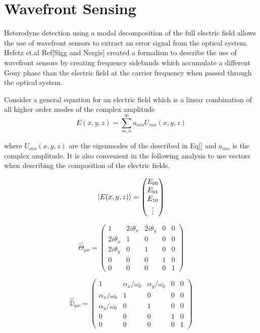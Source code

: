 \documentclass[oneside]{book}
\begin{document}
		
		\section{Wavefront Sensing}
		Heterodyne detection using a modal decomposition of the full electric field allows the use of wavefront sensors to extract an error signal from the optical system.  Hefetz et.al Ref[Sigg and Nergis] created a formalism to describe the use of wavefront sensors by creating frequency sidebands which accumulate a different Gouy phase than the electric field at the carrier frequency when passed through the optical system.  
		
		Consider a general equation for an electric field which is a linear combination of all higher order modes of the complex amplitude
		\begin{equation}
		E(x,y,z) = \sum\limits_{m,n}^{\infty} a_{mn} U_{mn}(x,y,z)
		\end{equation}
		
		where $ U_{mn}(x,y,z)$ are the eigenmodes of the described in Eq[] and $a_{mn}$ is the complex amplitude.  It is also convenient in the following analysis to use vectors when describing the composition of the electric fields.
		
		\begin{equation}
		\ket{E(x,y,z)} = \begin{pmatrix} E_{00} \\ E_{01} \\ E_{10} \\ \vdots \end{pmatrix}
		\end{equation}

		\begin{equation} \label{misalign_matrix}
		\hat{\Theta}_{\mu \nu} = 
		\begin{pmatrix}
		   1			&2i\theta_x		&2i\theta_y		& 0 & 0
		\\ 2i\theta_x	&1				&0				& 0	& 0
		\\ 2i\theta_y	&0				&1				& 0	& 0
		\\ 0			&0				&0				& 1	& 0
		\\ 0			&0				&0				& 0	& 1
		\end{pmatrix}
		\end{equation}

		\begin{equation} \label{mistrans_matrix}
		\hat{\mathbb{D}}_{\mu \nu} = 
		\begin{pmatrix}
			1					&\alpha_x/\omega_{0}	&\alpha_y/\omega_{0}	& 0 & 0
		\\ \alpha_x/\omega_{0}	&1						&0						& 0 & 0
		\\ \alpha_y/\omega_{0}	&0						&1						& 0	& 0
		\\ 0					&0						&0						& 1	& 0
		\\ 0					&0						&0						& 0 & 1 
		\end{pmatrix}
		\end{equation}
		
\end{document}
